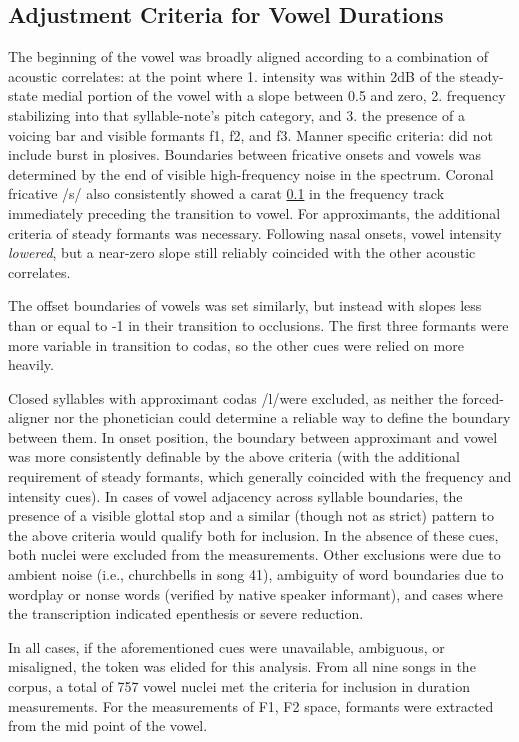 \subsection{Adjustment Criteria for Vowel Durations}
The beginning of the vowel was broadly aligned according to a combination of acoustic correlates: at the point where 1. intensity was within 2dB of the steady-state medial portion of the vowel with a slope between 0.5 and zero, 2. frequency stabilizing into that syllable-note's pitch category, and 3. the presence of a voicing bar and visible formants f1, f2, and f3. Manner specific criteria: did not include burst in plosives. Boundaries between fricative onsets and vowels was determined by the end of visible high-frequency noise in the spectrum. Coronal fricative /s/ also consistently showed a carat \ref{} in the frequency track immediately preceding the transition to vowel. For approximants, the additional criteria of steady formants was necessary. Following nasal onsets, vowel intensity {\it lowered}, but a near-zero slope still reliably coincided with the other acoustic correlates. 


 The offset boundaries of vowels was set similarly, but instead with slopes less than or equal to -1 in their transition to occlusions. The first three formants were more variable in transition to codas, so the other cues were relied on more heavily. 

Closed syllables with approximant codas /l/were excluded, as neither the forced-aligner nor the phonetician could determine a reliable way to define the boundary between them. In onset position, the boundary between approximant and vowel was more consistently definable by the above criteria (with the additional requirement of steady formants, which generally coincided with the frequency and intensity cues). In cases of vowel adjacency across syllable boundaries, the presence of a visible glottal stop and a similar (though not as strict) pattern to the above criteria would qualify both for inclusion. In the absence of these cues, both nuclei were excluded from the measurements. Other exclusions were due to ambient noise (i.e., churchbells in song 41), ambiguity of word boundaries due to wordplay or nonse words (verified by native speaker informant), and cases where the transcription indicated epenthesis or severe reduction. 


In all cases, if the aforementioned cues were unavailable, ambiguous, or misaligned, the token was elided for this analysis. From all nine songs in the corpus, a total of 757 vowel nuclei met the criteria for inclusion in duration measurements. For the measurements of F1, F2 space, formants were extracted from the mid point of the vowel. 


